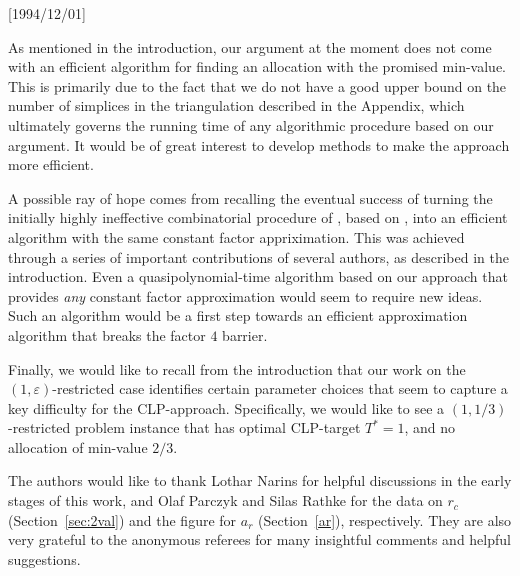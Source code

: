 \NeedsTeXFormat{LaTeX2e}[1994/12/01]\documentclass[letterpaper, 11pt]{article}
\theoremstyle{definition}
\theoremstyle{remark}
\numberwithin{equation}{section}
\begin{document}
As mentioned in the introduction, our argument at the moment does
not come with an efficient algorithm for finding an allocation with
the promised min-value. This is primarily due to the fact that
we do not have a good upper bound on the number of simplices in
the triangulation described in the Appendix, which ultimately
governs the running time of any algorithmic procedure
based on our argument. It would be of great interest to develop
methods to make the approach more efficient.

A possible ray of hope comes from recalling the eventual success of turning the
initially highly ineffective combinatorial procedure of
\cite{asadpourfeigesaberi}, based on \cite{haxell}, 
into an efficient algorithm with the same constant factor
appriximation. This was achieved through a series
of important contributions of several authors, as described in the introduction. 
Even a quasipolynomial-time algorithm based on our approach that provides
{\em any} constant factor approximation would seem to require new
ideas.
Such an algorithm would be a first step towards an efficient
approximation algorithm that breaks the factor $4$ barrier.



Finally, we would like to recall from the introduction
that our work on the $(1,\varepsilon)$-restricted case identifies certain
parameter choices that seem to capture a key difficulty for the
CLP-approach.
Specifically, we would like to see a $(1,1/3)$-restricted problem
instance that has optimal CLP-target $T^*=1$, and no allocation of
min-value $2/3$. 


\medskip
{} The authors would like to thank Lothar
Narins for helpful discussions in the early stages of this work, and Olaf Parczyk and Silas Rathke 
for the data on $r_c$  (Section~\ref{sec:2val}) and the figure for $a_r$ (Section~\ref{ar}), respectively.
They are also very grateful to the anonymous referees for many insightful comments and helpful suggestions. 
\end{document}
